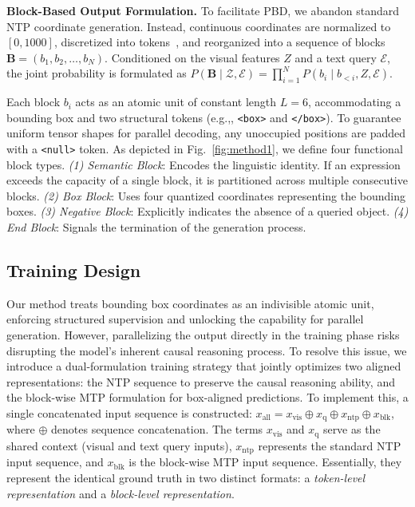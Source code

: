 \documentclass{llmxive}
\providecommand{\eg}{e.g.,\xspace}
\begin{document}
\noindent\textbf{Block-Based Output Formulation.}
To facilitate PBD, we abandon standard NTP coordinate generation. Instead, continuous coordinates are normalized to $[0, 1000]$, discretized into tokens~\citep{jiang2025rexomni, chen2021pix2seq}, and reorganized into a sequence of blocks $\mathbf{B} = (b_1, b_2, \dots, b_N)$. Conditioned on the visual features $Z$ and a text query $\mathcal{E}$, the joint probability is formulated as $P(\mathbf{B} \mid \mathcal{Z}, \mathcal{E}) = \prod_{i=1}^{N} P(b_i \mid b_{<i}, Z, \mathcal{E})$.

Each block \(b_i\) acts as an atomic unit of constant length \(L=6\), accommodating a bounding box and two structural tokens (\eg, \texttt{<box>} and \texttt{</box>}). To guarantee uniform tensor shapes for parallel decoding, any unoccupied positions are padded with a \texttt{<null>} token. As depicted in Fig.~\ref{fig:method1}, we define four functional block types. \textit{(1) Semantic Block}: Encodes the linguistic identity. If an expression exceeds the capacity of a single block, it is partitioned across multiple consecutive blocks.
\textit{(2) Box Block}: Uses four quantized coordinates representing the bounding boxes.
\textit{(3) Negative Block}: Explicitly indicates the absence of a queried object.
\textit{(4) End Block}: Signals the termination of the generation process.


\subsection{Training Design}
Our method treats bounding box coordinates as an indivisible atomic unit, enforcing structured supervision and unlocking the capability for parallel generation. However, parallelizing the output directly in the training phase risks disrupting the model's inherent causal reasoning process. To resolve this issue, we introduce a dual-formulation training strategy that jointly optimizes two aligned representations: the NTP sequence to preserve the causal reasoning ability, and the block-wise MTP formulation for box-aligned predictions. To implement this, a single concatenated input sequence is constructed: $x_{\text{all}} = x_{\text{vis}} \oplus x_{\text{q}} \oplus x_{\text{ntp}} \oplus x_{\text{blk}}$, where \(\oplus\) denotes sequence concatenation. The terms \(x_{\text{vis}}\) and \(x_{\text{q}}\) serve as the shared context (visual and text query inputs), \(x_{\text{ntp}}\) represents the standard NTP input sequence, and \(x_{\text{blk}}\) is the block-wise MTP input sequence. Essentially, they represent the identical ground truth in two distinct formats: a \textit{token-level representation} and a \textit{block-level representation}.
\end{document}
